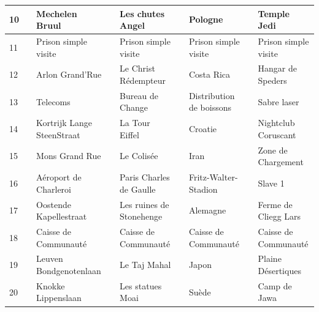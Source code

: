 \documentclass[letterpaper]{article}
\begin{document}
{\begin{tabular}{|l|l|l|l|l|l|l|l|l|}
      10 & \cellcolor[HTML]{1E90FF} & Mechelen Bruul & \cellcolor[HTML]{00BFFF} & Les chutes Angel & \cellcolor[HTML]{00BFFF} & Pologne & \cellcolor[HTML]{00BFFF} & Temple Jedi \\ \hline
      11 & \cellcolor[HTML]{000000} & Prison simple visite & \cellcolor[HTML]{FFFFFF} & Prison simple visite & \cellcolor[HTML]{FFFFFF} & Prison simple visite & \cellcolor[HTML]{FFFFFF} & Prison simple visite \\ \hline
      12 & \cellcolor[HTML]{FF69B4} & Arlon Grand'Rue & \cellcolor[HTML]{9932CC} & Le Christ Rédempteur & \cellcolor[HTML]{D02090} & Costa Rica & \cellcolor[HTML]{D02090} & Hangar de Speders \\ \hline
      13 & \cellcolor[HTML]{FFFFF0} & Telecoms & \cellcolor[HTML]{FFFFF0} & Bureau de Change & \cellcolor[HTML]{FFFFF0} & Distribution de boissons & \cellcolor[HTML]{FFFFF0} & Sabre laser \\ \hline
      14 & \cellcolor[HTML]{FF69B4} & Kortrijk Lange SteenStraat & \cellcolor[HTML]{9932CC} & La Tour Eiffel & \cellcolor[HTML]{D02090} & Croatie & \cellcolor[HTML]{D02090} & Nightclub Coruscant \\ \hline
      15 & \cellcolor[HTML]{FF69B4} & Mons Grand Rue & \cellcolor[HTML]{9932CC} & Le Colisée & \cellcolor[HTML]{D02090} & Iran & \cellcolor[HTML]{D02090} & Zone de Chargement \\ \hline
      16 & \cellcolor[HTML]{E6E6FA} & Aéroport de Charleroi & \cellcolor[HTML]{E6E6FA} & Paris Charles de Gaulle & \cellcolor[HTML]{E6E6FA} & Fritz-Walter-Stadion & \cellcolor[HTML]{E6E6FA} & Slave 1 \\ \hline
      17 & \cellcolor[HTML]{FF8C00} & Oostende Kapellestraat & \cellcolor[HTML]{FF8C00} & Les ruines de Stonehenge & \cellcolor[HTML]{FF8C00} & Alemagne & \cellcolor[HTML]{FF8C00} & Ferme de Cliegg Lars \\ \hline
      18 & \cellcolor[HTML]{EEEED1} & Caisse de Communauté & \cellcolor[HTML]{EEEED1} & Caisse de Communauté & \cellcolor[HTML]{EEEED1} & Caisse de Communauté & \cellcolor[HTML]{EEEED1} & Caisse de Communauté \\ \hline
      19 & \cellcolor[HTML]{FF8C00} & Leuven Bondgenotenlaan & \cellcolor[HTML]{FF8C00} & Le Taj Mahal & \cellcolor[HTML]{FF8C00} & Japon & \cellcolor[HTML]{FF8C00} & Plaine Désertiques \\ \hline
      20 & \cellcolor[HTML]{FF8C00} & Knokke Lippenslaan & \cellcolor[HTML]{FF8C00} & Les statues Moai & \cellcolor[HTML]{FF8C00} & Suède & \cellcolor[HTML]{FF8C00} & Camp de Jawa \\ \hline

\end{tabular}}
\end{document}
